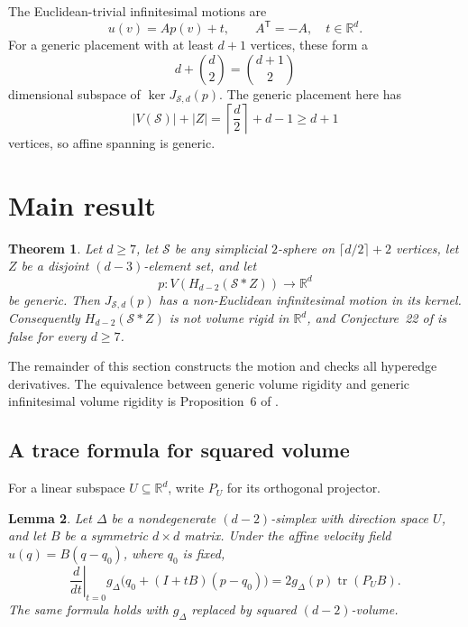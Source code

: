 \documentclass[11pt]{article}
\newtheorem{theorem}{Theorem}[section]
\newtheorem{lemma}[theorem]{Lemma}
\theoremstyle{definition}
\newcommand{\R}{\mathbb{R}}
\newcommand{\cS}{\mathcal{S}}
\newcommand{\tr}{\operatorname{tr}}
\begin{document}
The Euclidean-trivial infinitesimal motions are
\[
  u(v)=A p(v)+t,
  \qquad A^{\mathsf T}=-A,\quad t\in\R^d.
\]
For a generic placement with at least \(d+1\) vertices, these form a
\[
  d+\binom d2=\binom{d+1}{2}
\]
dimensional subspace of \(\ker J_{\cS,d}(p)\).  The generic placement
here has
\[
  |V(\cS)|+|Z|
  =\left\lceil\frac d2\right\rceil+d-1
  \geq d+1
\]
vertices, so affine spanning is generic.

\section{Main result}

\begin{theorem}
\label{thm:main}
Let \(d\geq 7\), let \(\cS\) be any simplicial \(2\)-sphere on
\(\lceil d/2\rceil+2\) vertices, let \(Z\) be a disjoint
\((d-3)\)-element set, and let
\[
  p:V(H_{d-2}(\cS*Z))\to\R^d
\]
be generic.  Then \(J_{\cS,d}(p)\) has a non-Euclidean infinitesimal
motion in its kernel.  Consequently \(H_{d-2}(\cS*Z)\) is not volume
rigid in \(\R^d\), and Conjecture~22 of
\cite{CruickshankJacksonTanigawa2026} is false for every \(d\geq 7\).
\end{theorem}

The remainder of this section constructs the motion and checks all
hyperedge derivatives.  The equivalence between generic volume rigidity
and generic infinitesimal volume rigidity is Proposition~6 of
\cite{CruickshankJacksonTanigawa2026}.

\subsection{A trace formula for squared volume}

For a linear subspace \(U\subseteq\R^d\), write \(P_U\) for its
orthogonal projector.

\begin{lemma}
\label{lem:trace}
Let \(\Delta\) be a nondegenerate \((d-2)\)-simplex with direction
space \(U\), and let \(B\) be a symmetric \(d\times d\) matrix.  Under
the affine velocity field \(u(q)=B(q-q_0)\), where \(q_0\) is fixed,
\[
  \left.\frac{d}{dt}\right|_{t=0}
  g_\Delta\bigl(q_0+(I+tB)(p-q_0)\bigr)
  =2g_\Delta(p)\tr(P_U B).
  \label{eq:trace-derivative}
\]
The same formula holds with \(g_\Delta\) replaced by squared
\((d-2)\)-volume.
\end{lemma}
\end{document}
